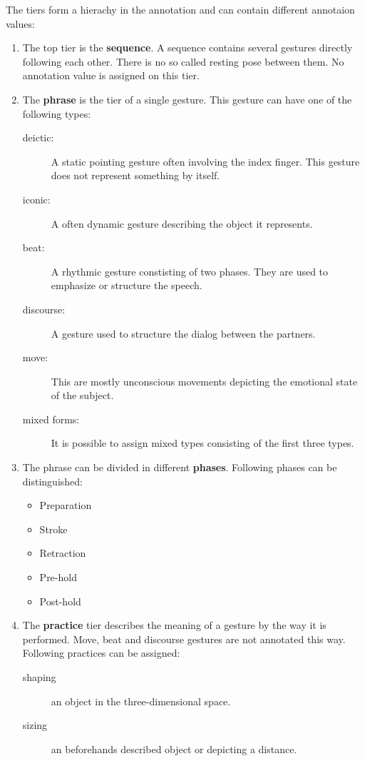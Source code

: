 \documentclass[a4paper]{article}
\begin{document}
				The tiers form a hierachy in the annotation and can contain different annotaion values:
				
				\begin{enumerate}
					\item The top tier is the \textbf{sequence}. A sequence contains several gestures directly following each other. There is no so called resting pose between them. No annotation value is assigned on this tier.
					\item The \textbf{phrase} is the tier of a single gesture. This gesture can have one of the following types:
					\begin{description}
						\item[deictic:] A static pointing gesture often involving the index finger. This gesture does not represent something by itself.
						\item[iconic:] A often dynamic gesture describing the object it represents.
						\item[beat:] A rhythmic gesture constisting of two phases. They are used to emphasize or structure the speech.
						\item[discourse:] A gesture used to structure the dialog between the partners.
						\item[move:] This are mostly unconscious movements depicting the emotional state of the subject.
						\item[mixed forms:] It is possible to assign mixed types consisting of the first three types.
					\end{description}
					\item The phrase can be divided in different \textbf{phases}. Following phases can be distinguished:
					\begin{itemize}
						\item Preparation
						\item Stroke
						\item Retraction
						\item Pre-hold
						\item Post-hold
					\end{itemize}
					\item The \textbf{practice} tier describes the meaning of a gesture by the way it is performed. Move, beat and discourse gestures are not annotated this way. Following practices can be assigned:
					\begin{description}
						\item[shaping] an object in the three-dimensional space.
						\item[sizing] an beforehands described object or depicting a distance.

\end{description}
\end{enumerate}
\end{document}
